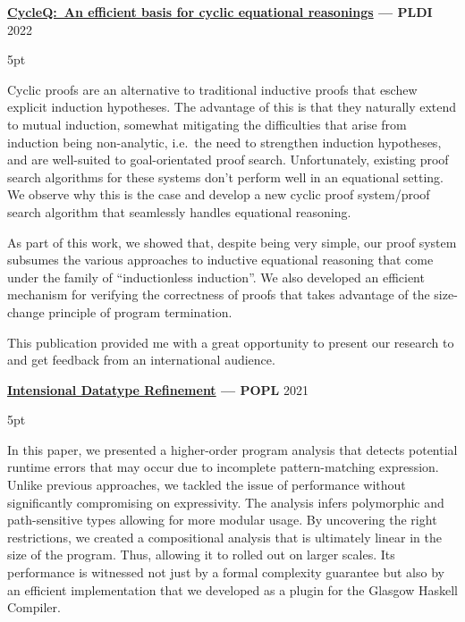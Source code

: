 \documentclass{article}
\newenvironment{tight-list}[1]{
  \vspace{5pt}
  \begin{adjustwidth}{15pt}{0pt}
  \begin{itemize}
    \setlength{\itemsep}{#1}
    \setlength{\parskip}{0pt}
    \setlength{\parsep}{0pt} 
}
{
  \end{itemize}
  \end{adjustwidth}
  \vspace{15pt}
}
\begin{document}
\textbf{\href{https://arxiv.org/abs/2111.12553}{CycleQ:\ An efficient basis for cyclic equational reasonings} --- PLDI} \hfill 2022
\begin{tight-list}{5pt}
\item Cyclic proofs are an alternative to traditional inductive proofs that eschew explicit induction hypotheses. The advantage of this is that they naturally extend to mutual induction, somewhat mitigating the difficulties that arise from induction being non-analytic, i.e.\ the need to strengthen induction hypotheses, and are well-suited to goal-orientated proof search. Unfortunately, existing proof search algorithms for these systems don't perform well in an equational setting. We observe why this is the case and develop a new cyclic proof system/proof search algorithm that seamlessly handles equational reasoning.
\item As part of this work, we showed that, despite being very simple, our proof system subsumes the various approaches to inductive equational reasoning that come under the family of ``inductionless induction''. We also developed an efficient mechanism for verifying the correctness of proofs that takes advantage of the size-change principle of program termination.
\item This publication provided me with a great opportunity to present our research to and get feedback from an international audience.
\end{tight-list}

\textbf{\href{https://arxiv.org/abs/2008.01452}{Intensional Datatype Refinement} --- POPL} \hfill 2021
\begin{tight-list}{5pt}
\item In this paper, we presented a higher-order program analysis that detects potential runtime errors that may occur due to incomplete pattern-matching expression.
Unlike previous approaches, we tackled the issue of performance without significantly compromising on expressivity.
The analysis infers polymorphic and path-sensitive types allowing for more modular usage.
By uncovering the right restrictions, we created a compositional analysis that is ultimately linear in the size of the program.
Thus, allowing it to rolled out on larger scales.
Its performance is witnessed not just by a formal complexity guarantee but also by an efficient implementation that we developed as a plugin for the Glasgow Haskell Compiler.
\end{tight-list}

\vspace{5pt}
\end{document}
